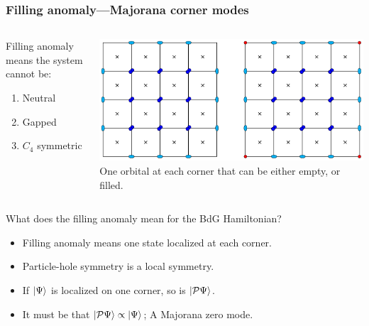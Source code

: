 \documentclass{beamer}
\newcommand{\mc}{\mathcal}
\renewcommand{\(}{\left(}
\renewcommand{\)}{\right)}
\renewcommand{\[}{\left[}
\renewcommand{\]}{\right]}
\begin{document}
\begin{frame}
    \frametitle{Filling anomaly---Majorana corner modes}
    \begin{columns}[b]
        \begin{column}[c]{0.4\textwidth}
            \begin{framed}
                Filling anomaly means the system cannot be: 
                \begin{enumerate}
                    \item Neutral
                    \item Gapped 
                    \item $C_4$ symmetric
                \end{enumerate}
                \citet*{Khalaf_Benalcazar_Hughes_Queiroz_2019}
            \end{framed}
        \end{column}
        \begin{column}[c]{0.6\textwidth}
            \centering
            \includegraphics[scale=0.65]{atomic_limit_half.pdf}
            One orbital at each corner that can be either empty, or filled.
        \end{column}
    \end{columns}
    \pause
    \vspace{5pt}
    What does the filling anomaly mean for the BdG Hamiltonian? 
    \begin{itemize}
        \item Filling anomaly means one state localized at each corner.  
        \item Particle-hole symmetry is a local symmetry.
        \item If $\ket{\Psi}$ is localized on one corner, so is $\ket{\mc P \Psi}$.
        \item It must be that $\ket{\mc P\Psi} \propto \ket{\Psi}$; A Majorana zero mode. 
    \end{itemize}
\end{frame}
\end{document}
